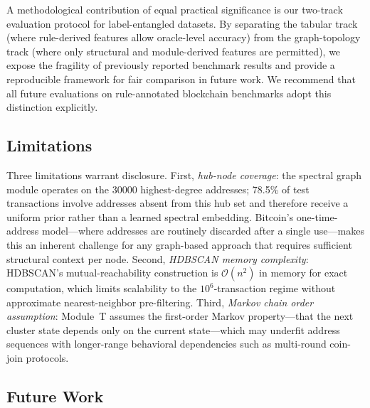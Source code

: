 A methodological contribution of equal practical significance is our
two-track evaluation protocol for label-entangled datasets.
By separating the tabular track (where rule-derived features allow oracle-level
accuracy) from the graph-topology track (where only structural and
module-derived features are permitted), we expose the fragility of
previously reported benchmark results and provide a reproducible framework
for fair comparison in future work.
We recommend that all future evaluations on rule-annotated blockchain
benchmarks adopt this distinction explicitly.

\subsection*{Limitations}

Three limitations warrant disclosure.
First, \emph{hub-node coverage}: the spectral graph module operates on the
\num{30000} highest-degree addresses; \num{78.5}\% of test transactions
involve addresses absent from this hub set and therefore receive a uniform
prior rather than a learned spectral embedding.
Bitcoin's one-time-address model---where addresses are routinely discarded
after a single use---makes this an inherent challenge for any graph-based
approach that requires sufficient structural context per node.
Second, \emph{HDBSCAN memory complexity}: HDBSCAN's mutual-reachability
construction is $\mathcal{O}(n^2)$ in memory for exact computation, which
limits scalability to the $10^6$-transaction regime without approximate
nearest-neighbor pre-filtering.
Third, \emph{Markov chain order assumption}: Module~T assumes the first-order
Markov property---that the next cluster state depends only on the current
state---which may underfit address sequences with longer-range behavioral
dependencies such as multi-round coin-join protocols.

\subsection*{Future Work}

